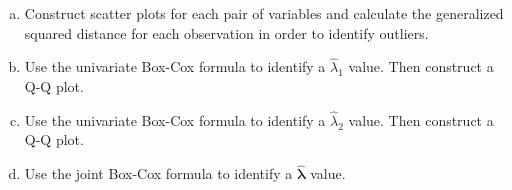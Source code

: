\documentclass[12pt]{article}\usepackage[]{graphicx}\usepackage[]{color}
\newenvironment{problem}[2][Problem]{\begin{trivlist}
\item[\hskip \labelsep {\bfseries #1}\hskip \labelsep {\bfseries #2.}]}{\end{trivlist}}
\newcommand{\vct}{\mathbf}
\begin{document}
\begin{problem}{4.41}
\end{problem}

\begin{enumerate}[a)]

\item Construct scatter plots for each pair of variables and calculate the generalized squared distance for each observation in order to identify outliers.

\item Use the univariate Box-Cox formula to identify a $\hat{\lambda}_1$ value. Then construct a Q-Q plot.

\item Use the univariate Box-Cox formula to identify a $\hat{\lambda}_2$ value. Then construct a Q-Q plot.

\item Use the joint Box-Cox formula to identify a $\vct{\hat{\lambda}}$ value.

\end{enumerate}
\end{document}
